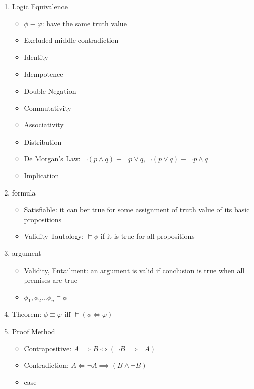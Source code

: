 \documentclass[11pt, a4paper]{article}
\begin{document}
\begin{enumerate}
        \item Logic Equivalence
            \begin{itemize}
                \item $\phi \equiv \varphi$: have the same truth value
                \item Excluded middle contradiction
                \item Identity
                \item Idempotence
                \item Double Negation
                \item Commutativity
                \item Associativity
                \item Distribution
                \item De Morgan's Law: $ \lnot (p \land q) \equiv \lnot p \lor q$, $ \lnot (p \lor q) \equiv \lnot p \land q$
                \item Implication
            \end{itemize}
        \item formula
            \begin{itemize}
                \item Satisfiable: it can ber true for some assignment of truth value of its basic propositions
                \item Validity Tautology: $\models \phi$ if it is true for all propositions
            \end{itemize}
        \item argument
            \begin{itemize}
                \item Validity, Entailment: an argument is valid if conclusion is true when all premises are true
                \item $\phi_1, \phi_2 \dots \phi_n \models \phi$
            \end{itemize}
        \item Theorem: $\phi \equiv \varphi$ iff $\models (\phi \iff \varphi)$
        \item Proof Method
            \begin{itemize}
                \item Contrapositive: $A \implies B \iff (\lnot B \implies \lnot A)$
                \item Contradiction: $A \iff \lnot A \implies (B \land \lnot B)$
                \item case

\end{itemize}
\end{enumerate}
\end{document}

